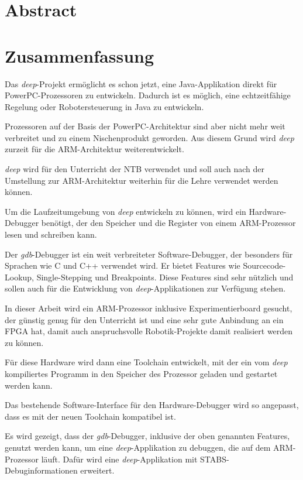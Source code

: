 
\chapter*{Abstract}





\chapter*{Zusammenfassung}
Das \textit{deep}-Projekt ermöglicht es schon jetzt, eine Java-Applikation direkt für PowerPC-Prozessoren zu entwickeln.
Dadurch ist es möglich, eine echtzeitfähige Regelung oder Robotersteuerung in Java zu entwickeln.

Prozessoren auf der Basis der PowerPC-Architektur sind aber nicht mehr weit verbreitet und zu einem Nischenprodukt geworden.
Aus diesem Grund wird \textit{deep} zurzeit für die ARM-Architektur weiterentwickelt.

\textit{deep} wird für den Unterricht der NTB verwendet und soll auch nach der Umstellung zur ARM-Architektur weiterhin für die Lehre verwendet werden können.

Um die Laufzeitumgebung von \textit{deep} entwickeln zu können, wird ein Hardware-Debugger benötigt, der den Speicher und die Register von einem ARM-Prozessor lesen und schreiben kann.

Der \textit{gdb}-Debugger ist ein weit verbreiteter Software-Debugger, der besonders für Sprachen wie C und C++ verwendet wird.
Er bietet Features wie Sourcecode-Lookup, Single-Stepping und Breakpoints.
Diese Features sind sehr nützlich und sollen auch für die Entwicklung von \textit{deep}-Applikationen zur Verfügung stehen.

In dieser Arbeit wird ein ARM-Prozessor inklusive Experimentierboard gesucht, der günstig genug für den Unterricht ist und eine sehr gute Anbindung an ein FPGA hat, damit auch anspruchsvolle Robotik-Projekte damit realisiert werden zu können.

Für diese Hardware wird dann eine Toolchain entwickelt, mit der ein vom \textit{deep} kompiliertes Programm in den Speicher des Prozessor geladen und gestartet werden kann.

Das bestehende Software-Interface für den Hardware-Debugger wird so angepasst, dass es mit der neuen Toolchain kompatibel ist.

Es wird gezeigt, dass der \textit{gdb}-Debugger, inklusive der oben genannten Features, genutzt werden kann, um eine \textit{deep}-Applikation zu debuggen, die auf dem ARM-Prozessor läuft.
Dafür wird eine \textit{deep}-Applikation mit STABS-Debuginformationen erweitert.


